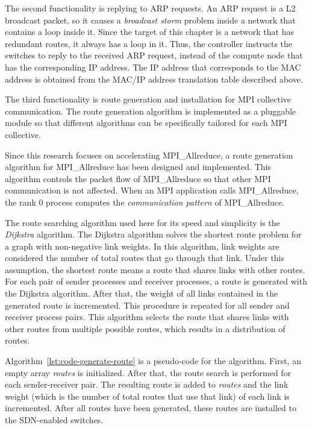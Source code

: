 The second functionality is replying to ARP requests. An ARP request is
a L2 broadcast packet, so it causes a \emph{broadcast storm} problem
inside a network that contains a loop inside it. Since the target of
this chapter is a network that has redundant routes, it always has a loop
in it. Thus, the controller instructs the switches to reply to the
received ARP request, instead of the compute node that has the
corresponding IP address. The IP address that corresponds to the MAC
address is obtained from the MAC/IP address translation table described above.

The third functionality is route generation and installation for MPI
collective communication. The route generation algorithm is implemented as a
pluggable module so that different algorithms can be specifically tailored for
each MPI collective.

Since this research focuses on accelerating MPI\_Allreduce, a route generation
algorithm for MPI\_Allreduce has been designed and implemented. This algorithm
controls the packet flow of MPI\_Allreduce so that other MPI communication is
not affected. When an MPI application calls MPI\_Allreduce, the rank 0 process
computes the \emph{communication pattern} of MPI\_Allreduce.

The route searching algorithm used here for its speed and simplicity is the
\emph{Dijkstra} algorithm. The Dijkstra algorithm solves the shortest route
problem for a graph with non-negative link weights. In this algorithm, link
weights are considered the number of total routes that go through that link.
Under this assumption, the shortest route means a route that shares links with
other routes. For each pair of sender processes and receiver processes, a
route is generated with the Dijkstra algorithm. After that, the weight of all
links contained in the generated route is incremented. This procedure is
repeated for all sender and receiver process pairs. This algorithm selects the
route that shares links with other routes from multiple possible routes, which
results in a distribution of routes.

Algorithm~\ref{lst:code-generate-route} is a pseudo-code for the algorithm.
First, an empty array \emph{routes} is initialized. After that, the
route search is performed for each sender-receiver pair. The resulting
route is added to \emph{routes} and the link weight (which is the number
of total routes that use that link) of each link is incremented. After
all routes have been generated, these routes are installed to the
SDN-enabled switches.

